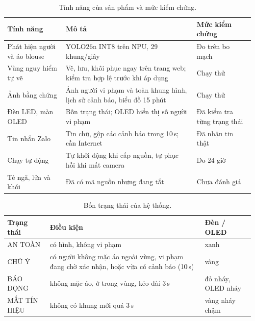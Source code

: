 \documentclass[11pt,a4paper,twocolumn]{article}
\begin{document}
\begin{table}[t]
\centering
\caption{Tính năng của sản phẩm và mức kiểm chứng.}
\label{tab:feat}
\footnotesize
\begin{tabular}{@{}>{\raggedright\arraybackslash}p{2.4cm}>{\raggedright\arraybackslash}p{3.6cm}>{\raggedright\arraybackslash}p{1.8cm}@{}}
\toprule
Tính năng & Mô tả & Mức kiểm chứng \\
\midrule
Phát hiện người và áo blouse & YOLO26n INT8 trên NPU, 29 khung/giây & Đo trên bo mạch \\
Vùng nguy hiểm tự vẽ & Vẽ, lưu, khôi phục ngay trên trang web; kiểm tra hợp lệ trước khi áp dụng & Chạy thử \\
Ảnh bằng chứng & Ảnh người vi phạm và toàn khung hình, lịch sử cảnh báo, biểu đồ 15 phút & Chạy thử \\
Đèn LED, màn OLED & Bốn trạng thái; OLED hiển thị số người vi phạm & Đã kiểm tra từng trạng thái \\
Tin nhắn Zalo & Tin chữ, gộp các cảnh báo trong 10\,s; cần Internet & Đã nhận tin thật \\
Chạy tự động & Tự khởi động khi cấp nguồn, tự phục hồi khi mất camera & Đo 24 giờ \\
Té ngã, lửa và khói & Đã có mã nguồn nhưng đang tắt & Chưa đánh giá \\
\bottomrule
\end{tabular}
\end{table}

\begin{table}[t]
\centering
\caption{Bốn trạng thái của hệ thống.}
\label{tab:states}
\footnotesize
\begin{tabular}{@{}>{\raggedright\arraybackslash}p{2.2cm}>{\raggedright\arraybackslash}p{3.6cm}>{\raggedright\arraybackslash}p{2.0cm}@{}}
\toprule
Trạng thái & Điều kiện & Đèn / OLED \\
\midrule
AN TOÀN & có hình, không vi phạm & xanh \\
CHÚ Ý & có người không mặc áo ngoài vùng, vi phạm đang chờ xác nhận, hoặc vừa có cảnh báo (10\,s) & vàng \\
BÁO ĐỘNG & không mặc áo, ở trong vùng, kéo dài 3\,s & đỏ nháy, OLED nháy \\
MẤT TÍN HIỆU & không có khung mới quá 3\,s & vàng nháy chậm \\
\bottomrule
\end{tabular}
\end{table}
\end{document}
